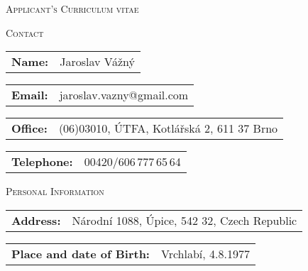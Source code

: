 \begin{cv}
\smallskip
\vspace{-1.2cm}
\begin{center}
 {\large \textsc{Applicant's Curriculum vitae}\\ 
}\end{center}
 \vspace{-0.1 cm}

\setlength{\oldcvlabelwidth}{\cvlabelwidth}
\setlength{\oldcvlabelsep}{\cvlabelsep}

\setlength{\cvlabelwidth}{1em} 
\noindent\hrulefill
\begin{cvlist}{\large \textsc{Contact}}
\item \begin{tabular}{p{2cm}p{11cm}}  {\bf{Name:}} & Jaroslav Vážný\\
   \end{tabular}
 \item \begin{tabular}{p{2cm}p{11cm}}  
  {\bf{Email:}} & jaroslav.vazny@gmail.com\\
   \end{tabular}
  \item \begin{tabular}{p{2cm}p{11cm}}
  {\bf{Office:}} & (06)03010, ÚTFA, Kotlářská 2, 611 37 Brno\\
   \end{tabular}
   \item \begin{tabular}{p{2cm}p{11cm}}
  {\bf{Telephone:}} & 00420/606\,777\,65\,64\\
   \end{tabular}
\end{cvlist}

\begin{cvlist}{\large \textsc{Personal Information}}
\item \begin{tabular}{p{4cm}p{11cm}}  {\bf{Address:}} & Národní 1088, Úpice, 542 32, Czech Republic \end{tabular}
\item \begin{tabular}{p{4cm}p{11cm}}  {\bf{Place and date of Birth:}} & Vrchlabí, 4.8.1977 \end{tabular}
\end{cvlist}


\end{cv}
